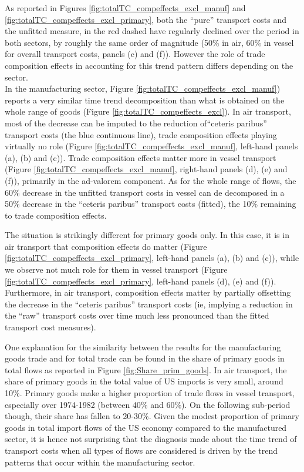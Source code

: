 \documentclass[11pt,twoside, authoryear]{elsarticle}
\begin{document}
As reported in Figures \ref{fig:totalTC_compeffects_excl_manuf} and \ref{fig:totalTC_compeffects_excl_primary}, both the ``pure'' transport costs and the unfitted measure, in the red dashed have regularly declined over the period in both sectors, by roughly the same order of magnitude (50\% in air, 60\% in vessel for overall transport costs, panels (c) and (f)). However the role of trade composition effects in accounting for this trend pattern differs depending on the sector.\\
In the manufacturing sector, Figure \ref{fig:totalTC_compeffects_excl_manuf}) reports a very similar time trend decomposition than what is obtained on the whole range of goods (Figure \ref{fig:totalTC_compeffects_excl}).  In air transport, most of the decrease can be imputed to the reduction of``ceteris paribus'' transport costs (the blue continuous line), trade composition effects playing virtually no role (Figure \ref{fig:totalTC_compeffects_excl_manuf}, left-hand panels (a), (b) and (c)). Trade composition effects matter more in vessel transport (Figure \ref{fig:totalTC_compeffects_excl_manuf}, right-hand panels (d), (e) and (f)), primarily in the ad-valorem component. As for the whole range of flows, the 60\% decrease in the unfitted transport costs in vessel can de decomposed in a 50\% decrease in the ``ceteris paribus'' transport costs (fitted), the 10\% remaining to trade composition effects.

The situation is strikingly different for primary goods only. In this case, it is in air transport that composition effects do matter (Figure \ref{fig:totalTC_compeffects_excl_primary}, left-hand panels (a), (b) and (c)), while we observe not much role for them in vessel transport (Figure \ref{fig:totalTC_compeffects_excl_primary}, left-hand panels (d), (e) and (f)). Furthermore, in air transport, composition effects matter by partially offsetting the decrease in the ``ceteris paribus'' transport costs (ie, implying a reduction in the ``raw'' transport costs over time much less pronounced than the fitted transport cost measures).

One explanation for the similarity between the results for the manufacturing goods trade and for total trade can be found in the share of primary goods in total flows as reported in Figure \ref{fig:Share_prim_goods}. In air transport, the share of primary goods in the total value of US imports is very small, around 10\%. Primary goods make a higher proportion of trade flows in vessel transport, especially over 1974-1982 (between 40\% and 60\%). On the following sub-period though, their share has fallen to 20-30\%. Given the modest proportion of primary goods in total import flows of the US economy compared to the manufactured sector, it is hence not surprising that the diagnosis made about the time trend of transport costs when all types of flows are considered is driven by the trend patterns that occur within the manufacturing sector.
\end{document}
